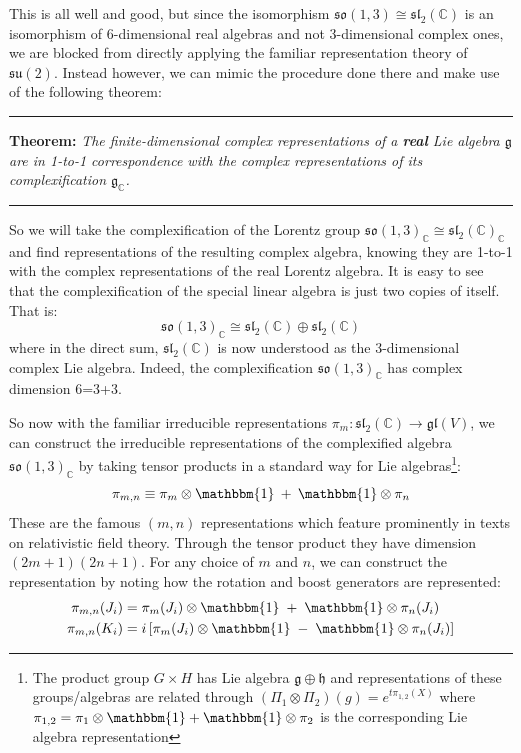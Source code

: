 \documentclass[onecolumn]{gwclass}
\begin{document}
This is all well and good, but since the isomorphism $\mathfrak{so}(1,3)\cong\mathfrak{sl}_2(\mathbb{C})$ is an isomorphism of 6-dimensional real algebras and not 3-dimensional complex ones, we are blocked from directly applying the familiar representation theory of $\mathfrak{su}(2)$. Instead however, we can mimic the procedure done there and make use of the following theorem:\\
\rule{\textwidth}{1pt}
\textbf{Theorem:} \emph{The finite-dimensional complex representations of a \textbf{real} Lie algebra $\mathfrak{g}$ are in 1-to-1 correspondence with the complex representations of its complexification $\mathfrak{g}_\mathbb{C}$.}\\
\noindent\rule{\textwidth}{1pt}
So we will take the complexification of the Lorentz group $\mathfrak{so}(1,3)_\mathbb{C} \cong \mathfrak{sl}_2(\mathbb{C})_\mathbb{C}$ and find representations of the resulting complex algebra, knowing they are 1-to-1 with the complex representations of the real Lorentz algebra. It is easy to see that the complexification of the special linear algebra is just two copies of itself. That is:
$$ \mathfrak{so}(1,3)_\mathbb{C} \cong \mathfrak{sl}_2(\mathbb{C}) \oplus \mathfrak{sl}_2(\mathbb{C}) $$
where in the direct sum, $\mathfrak{sl}_2(\mathbb{C})$ is now understood as the 3-dimensional complex Lie algebra. Indeed, the complexification $\mathfrak{so}(1,3)_\mathbb{C}$ has complex dimension 6=3+3.

So now with the familiar irreducible representations $\pi_m:\mathfrak{sl}_2(\mathbb{C})\to\mathfrak{gl}(V)$, we can construct the irreducible representations of the complexified algebra $\mathfrak{so}(1,3)_\mathbb{C}$ by taking tensor products in a standard way for Lie algebras\footnote{The product group $G\times H$ has Lie algebra $\mathfrak{g}\oplus\mathfrak{h}$ and representations of these groups/algebras are related through $(\Pi_1\otimes\Pi_2)(g)=e^{t \pi_{1,2}(X)}$ where $\pi_{1,2}=\pi_1\otimes\mathbbm{1} + \mathbbm{1}\otimes\pi_2$ is the corresponding Lie algebra representation}:
$$ \pi_{m,n} \equiv \pi_m\otimes\mathbbm{1} \:+\: \mathbbm{1}\otimes \pi_n $$
These are the famous $(m,n)$ representations which feature prominently in texts on relativistic field theory. Through the tensor product they have dimension $(2m+1)(2n+1)$. For any choice of $m$ and $n$, we can construct the representation by noting how the rotation and boost generators are represented:
\begin{align*}
	\pi_{m,n}(J_i) &= \pi_m(J_i)\otimes\mathbbm{1} \;+\; \mathbbm{1}\otimes \pi_n(J_i) \\
	\pi_{m,n}(K_i) &= i\left[ \pi_m(J_i)\otimes\mathbbm{1} \;-\; \mathbbm{1}\otimes\pi_n(J_i)\right]
\end{align*}
\end{document}
